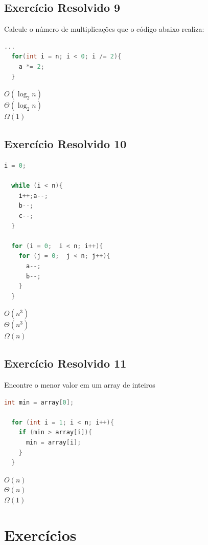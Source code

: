 \documentclass[12pt]{article}
\begin{document}
\subsection{Exercício Resolvido 9}
Calcule o número de multiplicações que o código abaixo realiza:
\begin{lstlisting}[language=C]
  ...
  for(int i = n; i < 0; i /= 2){
    a *= 2;
  }
\end{lstlisting}
$O(\log_{2}n)$\\
$\Theta(\log_{2}n)$\\
$\Omega(1)$\\

\subsection{Exercício Resolvido 10}
\begin{lstlisting}[language=C]
  i = 0;
  
  while (i < n){
    i++;a--;
    b--;
    c--;
  }
  
  for (i = 0;  i < n; i++){
    for (j = 0;  j < n; j++){
      a--;
      b--;
    }
  }
\end{lstlisting}
$O(n^3)$\\
$\Theta(n^3)$\\
$\Omega(n)$\\

\subsection{Exercício Resolvido 11}
Encontre o menor valor em um array de inteiros
\begin{lstlisting}[language=C]
  int min = array[0];
  
  for (int i = 1; i < n; i++){
    if (min > array[i]){
      min = array[i];
    }
  }
\end{lstlisting}
$O(n)$\\
$\Theta(n)$\\
$\Omega(1)$\\

\section{Exercícios}
\end{document}
